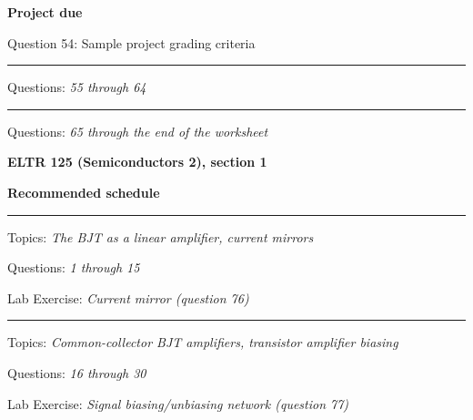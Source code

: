 \hskip 10pt {\bf Project due}

\hskip 10pt Question 54: Sample project grading criteria
 
\vskip 10pt

\hrule \vskip 5pt
\noindent
{}

\hskip 10pt Questions: {\it 55 through 64}
 
\vskip 10pt
\hrule \vskip 5pt
\noindent
{}

\hskip 10pt Questions: {\it 65 through the end of the worksheet}
 
\vskip 10pt












\vfil \eject

\centerline{\bf ELTR 125 (Semiconductors 2), section 1} \bigskip 
 
\vskip 10pt

\noindent
{\bf Recommended schedule}

\vskip 5pt

\hrule \vskip 5pt
\noindent
{}

\hskip 10pt Topics: {\it The BJT as a linear amplifier, current mirrors}
 
\hskip 10pt Questions: {\it 1 through 15}
 
\hskip 10pt Lab Exercise: {\it Current mirror (question 76)}
 


\vskip 10pt
\hrule \vskip 5pt
\noindent
{}

\hskip 10pt Topics: {\it Common-collector BJT amplifiers, transistor amplifier biasing}
 
\hskip 10pt Questions: {\it 16 through 30}
 
\hskip 10pt Lab Exercise: {\it Signal biasing/unbiasing network (question 77)}
 
 
